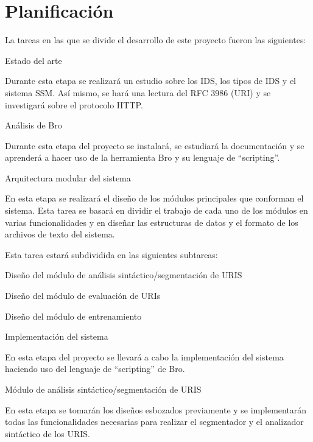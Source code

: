\section{Planificación}

La tareas en las que se divide el desarrollo de este proyecto fueron las siguientes:


\begin{legal}
\item Estado del arte

Durante esta etapa se realizará un estudio sobre los IDS, los tipos de IDS y el sistema SSM. Así mismo, se hará una lectura del RFC 3986 (URI) y se investigará sobre el protocolo HTTP.

\item Análisis de Bro

Durante esta etapa del proyecto se instalará, se estudiará la documentación y se aprenderá a hacer uso de la herramienta Bro y su lenguaje de ``scripting''.

\item Arquitectura modular del sistema 

En esta etapa se realizará el diseño de los módulos principales que conforman el sistema. Esta tarea se basará en dividir el trabajo de cada uno de los módulos en varias funcionalidades y en diseñar las estructuras de datos y el formato de los archivos de texto del sistema.

    Esta tarea estará subdividida en las siguientes subtareas:

\begin{legal}
\item Diseño del módulo de análisis sintáctico/segmentación de URIS 
\item Diseño del módulo de evaluación de URIs 
\item Diseño del módulo de entrenamiento 
\end{legal}
\item Implementación del sistema

En esta etapa del proyecto se llevará a cabo la implementación del sistema haciendo uso del lenguaje de ``scripting'' de Bro.

\begin{legal}
\item Módulo de análisis sintáctico/segmentación de URIS 

En esta etapa se tomarán los diseños esbozados previamente y se implementarán todas las funcionalidades necesarias para realizar el segmentador y el analizador sintáctico de los URIS.


\end{legal}
\end{legal}
